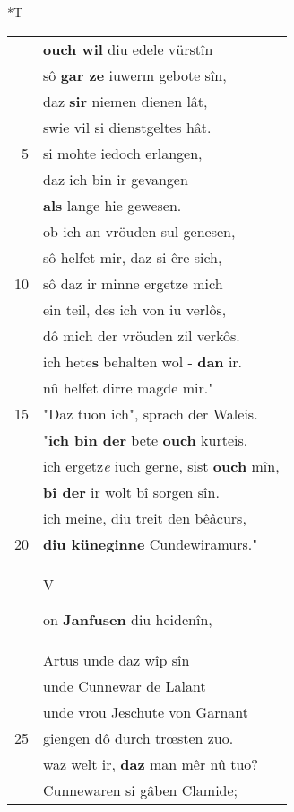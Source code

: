 \documentclass[8pt,a4paper,notitlepage]{article}
\begin{document}
\begin{table}[ht]
\begin{minipage}[t]{0.5\linewidth}
\end{minipage}
\hspace{0.5cm}
\begin{minipage}[t]{0.5\linewidth}
\small
\begin{center}*T
\end{center}
\begin{tabular}{rl}
 & \textbf{ouch wil} diu edele vürstîn\\ 
 & sô \textbf{gar ze} iuwerm gebote sîn,\\ 
 & daz \textbf{sir} niemen dienen lât,\\ 
 & swie vil si dienstgeltes hât.\\ 
5 & si mohte iedoch erlangen,\\ 
 & daz ich bin ir gevangen\\ 
 & \textbf{als} lange hie gewesen.\\ 
 & ob ich an vröuden sul genesen,\\ 
 & sô helfet mir, daz si êre sich,\\ 
10 & sô daz ir minne ergetze mich\\ 
 & ein teil, des ich von iu verlôs,\\ 
 & dô mich der vröuden zil verkôs.\\ 
 & ich hete\textbf{s} behalten wol - \textbf{dan} ir.\\ 
 & nû helfet dirre magde mir."\\ 
15 & "Daz tuon ich", sprach der Waleis.\\ 
 & "\textbf{ich bin der} bete \textbf{ouch} kurteis.\\ 
 & ich ergetz\textit{e} iuch gerne, sist \textbf{ouch} mîn,\\ 
 & \textbf{bî der} ir wolt bî sorgen sîn.\\ 
 & ich meine, diu treit den bêâcurs,\\ 
20 & \textbf{diu küneginne} Cundewiramurs."\\ 
 & \begin{large}V\end{large}on \textbf{Janfusen} diu heidenîn,\\ 
 & Artus unde daz wîp sîn\\ 
 & unde Cunnewar de Lalant\\ 
 & unde vrou Jeschute von Garnant\\ 
25 & giengen dô durch trœsten zuo.\\ 
 & waz welt ir, \textbf{daz} man mêr nû tuo?\\ 
 & Cunnewaren si gâben Clamide;\\ 

\end{tabular}
\end{minipage}
\end{table}
\end{document}

